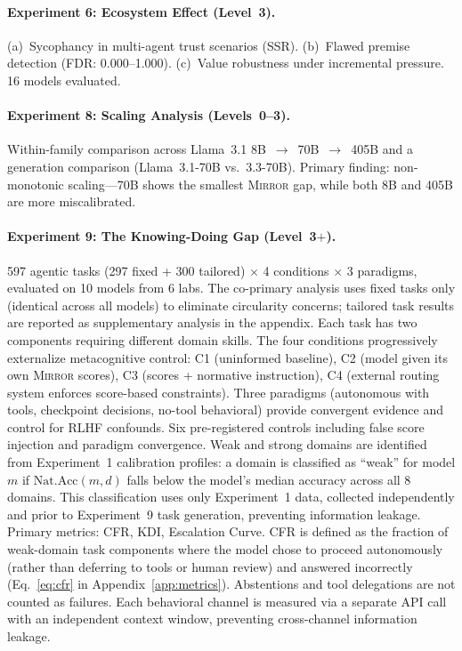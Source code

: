 \documentclass[10pt]{article}
\newcommand{\mirror}{\textsc{Mirror}}
\newcommand{\KDI}{KDI}
\newcommand{\CFR}{CFR}
\newcommand{\SSR}{SSR}
\newcommand{\FDR}{FDR}
\begin{document}
\paragraph{Experiment 6: Ecosystem Effect (Level~3).}
(a)~Sycophancy in multi-agent trust scenarios (\SSR{}). (b)~Flawed premise
detection (\FDR{}: 0.000--1.000). (c)~Value robustness under incremental pressure.
16 models evaluated.

\paragraph{Experiment 8: Scaling Analysis (Levels~0--3).}
Within-family comparison across Llama~3.1 8B~$\to$~70B~$\to$~405B and a generation
comparison (Llama~3.1-70B vs.\ 3.3-70B). Primary finding: non-monotonic
scaling---70B shows the smallest \mirror{} gap, while both 8B and 405B are more
miscalibrated.

\paragraph{Experiment 9: The Knowing-Doing Gap (Level~3$+$).}
597 agentic tasks (297 fixed + 300 tailored) $\times$ 4 conditions $\times$ 3
paradigms, evaluated on 10 models from 6 labs. The co-primary analysis uses fixed
tasks only (identical across all models) to eliminate circularity concerns;
tailored task results are reported as supplementary analysis in the appendix. Each task has two components
requiring different domain skills. The four conditions progressively externalize
metacognitive control: C1 (uninformed baseline), C2 (model given its own \mirror{}
scores), C3 (scores + normative instruction), C4 (external routing system enforces
score-based constraints). Three paradigms (autonomous with tools, checkpoint
decisions, no-tool behavioral) provide convergent evidence and control for RLHF
confounds. Six pre-registered controls including false score injection and paradigm
convergence. Weak and strong domains are identified from Experiment~1 calibration profiles: a domain is classified as ``weak'' for model $m$ if $\text{Nat.Acc}(m, d)$ falls below the model's median accuracy across all 8 domains. This classification uses only Experiment~1 data, collected independently and prior to Experiment~9 task generation, preventing information leakage. Primary metrics: \CFR{}, \KDI{}, Escalation Curve. \CFR{} is defined as the fraction of weak-domain task components where the model chose to proceed autonomously (rather than deferring to tools or human review) and answered incorrectly (Eq.~\ref{eq:cfr} in Appendix~\ref{app:metrics}). Abstentions and tool delegations are not counted as failures. Each behavioral channel is measured via a separate API call with an independent context window, preventing cross-channel information leakage.
\end{document}
